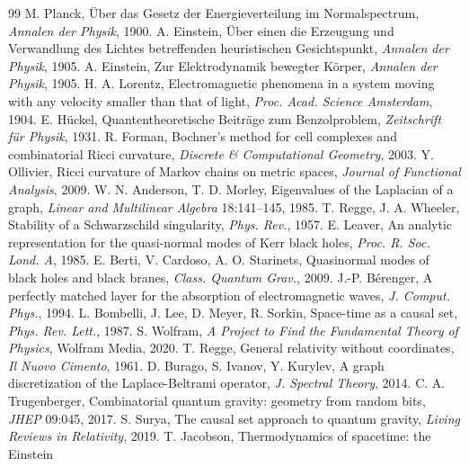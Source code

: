 \documentclass[10pt,twocolumn]{article}
\begin{document}
\clearpage
\begin{thebibliography}{99}
\small
{} M. Planck, \"Uber das Gesetz der Energieverteilung im
Normalspectrum, \textit{Annalen der Physik}, 1900.
 A. Einstein, \"Uber einen die Erzeugung und Verwandlung des
Lichtes betreffenden heuristischen Gesichtspunkt, \textit{Annalen der Physik}, 1905.
 A. Einstein, Zur Elektrodynamik bewegter K\"orper,
\textit{Annalen der Physik}, 1905.
 H. A. Lorentz, Electromagnetic phenomena in a system moving
with any velocity smaller than that of light, \textit{Proc. Acad. Science
Amsterdam}, 1904.
 E. H\"uckel, Quantentheoretische Beitr\"age zum
Benzolproblem, \textit{Zeitschrift f\"ur Physik}, 1931.
 R. Forman, Bochner's method for cell complexes and
combinatorial Ricci curvature, \textit{Discrete \& Computational Geometry}, 2003.
 Y. Ollivier, Ricci curvature of Markov chains on metric
spaces, \textit{Journal of Functional Analysis}, 2009.
 W. N. Anderson, T. D. Morley, Eigenvalues of the
Laplacian of a graph, \textit{Linear and Multilinear Algebra} 18:141--145, 1985.
 T. Regge, J. A. Wheeler, Stability of a Schwarzschild
singularity, \textit{Phys. Rev.}, 1957.
 E. Leaver, An analytic representation for the quasi-normal
modes of Kerr black holes, \textit{Proc. R. Soc. Lond. A}, 1985.
 E. Berti, V. Cardoso, A. O. Starinets, Quasinormal modes of
black holes and black branes, \textit{Class. Quantum Grav.}, 2009.
 J.-P. B\'erenger, A perfectly matched layer for the
absorption of electromagnetic waves, \textit{J. Comput. Phys.}, 1994.
 L. Bombelli, J. Lee, D. Meyer, R. Sorkin, Space-time as a
causal set, \textit{Phys. Rev. Lett.}, 1987.
 S. Wolfram, \textit{A Project to Find the Fundamental Theory
of Physics}, Wolfram Media, 2020.
 T. Regge, General relativity without coordinates, \textit{Il
Nuovo Cimento}, 1961.
 D. Burago, S. Ivanov, Y. Kurylev, A graph discretization of the
Laplace-Beltrami operator, \textit{J. Spectral Theory}, 2014.
 C. A. Trugenberger, Combinatorial quantum gravity:
geometry from random bits, \textit{JHEP} 09:045, 2017.
 S. Surya, The causal set approach to quantum gravity,
\textit{Living Reviews in Relativity}, 2019.
 T. Jacobson, Thermodynamics of spacetime: the Einstein

\end{thebibliography}
\end{document}
